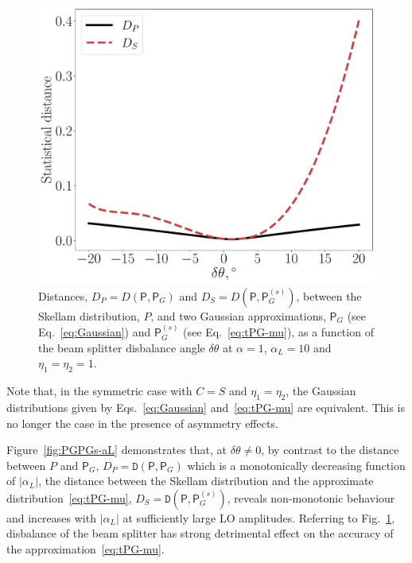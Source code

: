 \documentclass[%
reprint,
superscriptaddress,
 amsmath,amssymb,amsfonts,
 aps,
 pra,
 longbibliography
]{revtex4-2}
\newcommand{\prob}{\mathsf{P}}
\begin{document}
\begin{figure}[ht!]
    \centering
    \includegraphics[width=.95\linewidth]{pics/appendix/app_2.pdf}
    \caption{Distances, $D_P=D(\prob,\prob_G)$ and $D_S=D(\prob,\prob_G^{(s)})$, 
      between the Skellam distribution, $P$, and
      two Gaussian approximations, $\prob_G$ (see Eq.~\eqref{eq:Gaussian})
      and  ${\prob}_G^{(s)}$ (see Eq.~\eqref{eq:tPG-mu}), as a function of
      the beam splitter disbalance angle $\delta\theta$ at
$\alpha=1$, $\alpha_L=10$ and
      $\eta_1=\eta_2=1$.
    }
    \label{fig:PGPGs-dth}
\end{figure}


Note that,
in the symmetric
case with $C=S$ and $\eta_1=\eta_2$,
the Gaussian distributions given by
Eqs.~\eqref{eq:Gaussian} and~\eqref{eq:tPG-mu} are equivalent.
This is no longer the case in the presence of asymmetry effects.

Figure~\ref{fig:PGPGs-aL} demonstrates
that, at $\delta\theta\ne 0$,
by contrast to the distance between $P$ and $\prob_G$,
$D_P=\mathtt{D}(\prob,\prob_G)$ which is a monotonically decreasing function of
$|\alpha_L|$,
the distance
between the Skellam distribution and
the approximate distribution~\eqref{eq:tPG-mu},
$D_S=\mathtt{D}(\prob,\prob_G^{(s)})$,
reveals non-monotonic behaviour and
increases with $|\alpha_L|$ at sufficiently large LO amplitudes.
Referring to Fig.~\ref{fig:PGPGs-dth},
disbalance of the beam splitter
has strong detrimental effect on
the accuracy of the approximation~\eqref{eq:tPG-mu}.
\end{document}
